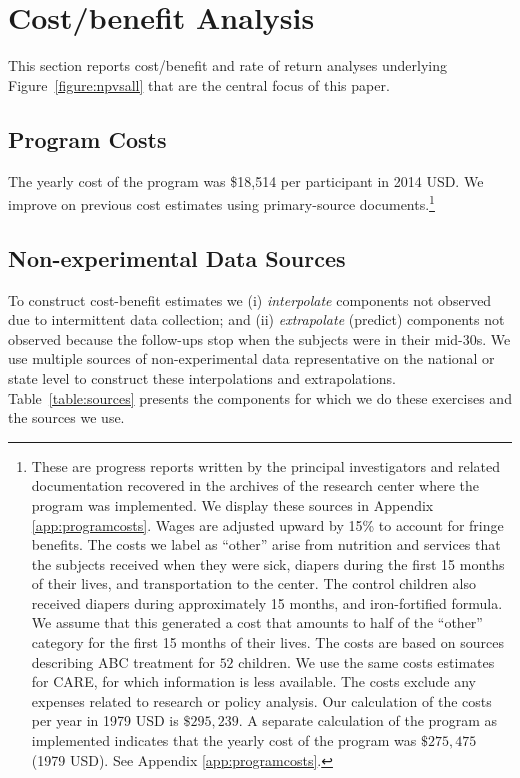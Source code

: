 \section{Cost/benefit Analysis} \label{section:cbaresults}

This section reports cost/benefit and rate of return analyses underlying Figure~\ref{figure:npvsall} that are the central focus of this paper.

\subsection{Program Costs} \label{section:programscosts}

The yearly cost of the program was \$18,514 per participant in 2014 USD. We improve on previous cost estimates using primary-source documents.\footnote{These are progress reports written by the principal investigators and related documentation recovered in the archives of the research center where the program was implemented. We display these sources in Appendix \ref{app:programcosts}. Wages are adjusted upward by 15\% to account for fringe benefits. The costs we label as ``other'' arise from nutrition and services that the subjects received when they were sick, diapers during the first 15 months of their lives, and transportation to the center. The control children also received diapers during approximately 15 months, and iron-fortified formula. We assume that this generated a cost that amounts to half of the ``other'' category for the first 15 months of their lives. The costs are based on sources describing ABC treatment for $52$ children. We use the same costs estimates for CARE, for which information is less available. The costs exclude any expenses related to research or policy analysis. Our calculation of the costs per year in 1979 USD is $\$295,239$. A separate calculation of the program as implemented indicates that the yearly cost of the program was $\$275,475$ (1979 USD). See Appendix \ref{app:programcosts}.}

\subsection{Non-experimental Data Sources}

To construct cost-benefit estimates we (i) \textit{interpolate} components not observed due to intermittent data collection; and (ii) \textit{extrapolate} (predict) components not observed because the follow-ups stop when the subjects were in their mid-30s. We use multiple sources of non-experimental data representative on the national or state level to construct these interpolations and extrapolations. Table~\ref{table:sources} presents the components for which we do these exercises and the sources we use.

